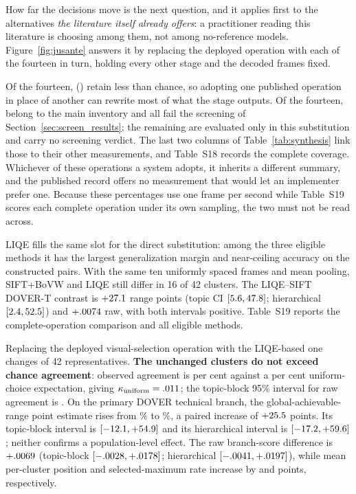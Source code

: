 How far the decisions move is the next question, and it applies first to the alternatives
\emph{the literature itself already offers}: a practitioner reading this literature is
choosing among them, not among no-reference models. Figure~\ref{fig:jusante} answers it by
replacing the deployed operation with each of the fourteen in turn, holding every other
stage and the decoded frames fixed.



Of the fourteen, \jusAbaixo{} (\jusAbaixoNomes{}) retain less than chance, so adopting one
published operation in place of another can rewrite most of what the stage outputs. Of the fourteen, \jusAuditadas{} belong to the main inventory and all \jusAuditadas{} fail
the screening of Section~\ref{sec:screen_results}; the remaining \jusSoJusante{} are
evaluated only in this substitution and carry no screening verdict. The last two columns of
Table~\ref{tab:synthesis} link those \jusAuditadas{} to their other measurements, and
Table~S18 records the complete coverage. Whichever of these operations a system adopts, it
inherits a different summary, and the published record offers no measurement that would let
an implementer prefer one. Because these percentages use one frame per second while
Table~S19 scores each complete operation under its own sampling, the two must not be read
across.

LIQE fills the same slot for the direct substitution: among the three eligible methods it
has the largest generalization margin and near-ceiling accuracy on the constructed pairs. With the same ten uniformly spaced frames and mean
pooling, SIFT+BoVW and LIQE still differ in 16 of 42 clusters. The LIQE--SIFT DOVER-T contrast is $+27.1{}$ range points (topic CI
$[5.6,47.8]{}$; hierarchical $[2.4,52.5]{}$) and $+.0074{}$ raw, with both
intervals positive. Table~S19 reports the complete-operation comparison and all eligible methods.

Replacing the deployed visual-selection operation with the LIQE-based one changes
\casCompleta{} of 42 representatives. \textbf{The \subResta{} unchanged clusters do not exceed chance agreement}: observed
agreement is \subPct{} per cent against a \subAcaso{} per cent uniform-choice expectation,
giving $\kappa_{\mathrm{uniform}}=.011{}$; the topic-block 95\% interval for raw
agreement is \subIC{}. On the primary DOVER technical branch, the global-achievable-range point estimate rises from \dovImplantada{}\% to
\dovLiqe{}\%, a paired increase of $+25.5{}$ points. Its topic-block interval is $[-12.1,+54.9]{}$ and its hierarchical interval is
$[-17.2,+59.6]{}$; neither confirms a population-level effect. The raw branch-score difference is $+.0069{}$ (topic-block $[-.0028,+.0178]{}$;
hierarchical $[-.0041,+.0197]{}$), while mean per-cluster position and selected-maximum rate
increase by \dovPosicao{} and \dovMaximo{} points, respectively.

